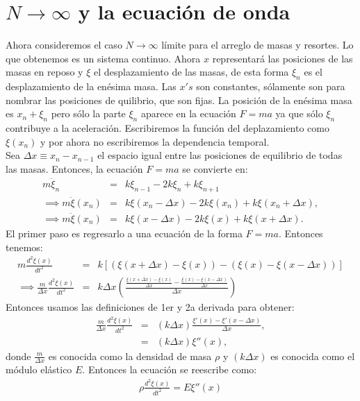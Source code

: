 \documentclass[letterpaper,12pt,oneside]{book}
\begin{document}
\section{$N \to \infty$ y la ecuaci\'on de onda}
Ahora consideremos el caso $N \to \infty$ l\'imite para el arreglo de masas y resortes. Lo que obtenemos es un sistema continuo. Ahora $x$ representar\'a las posiciones de las masas en reposo y $\xi$ el desplazamiento de las masas, de esta forma $\xi_n$ es el desplazamiento de la en\'esima masa. Las $x's$ son constantes, s\'olamente son para nombrar las posiciones de quilibrio, que son fijas. La posici\'on de la en\'esima masa es $x_n + \xi_n$ pero s\'olo la parte $\xi_n$ aparece en la ecuaci\'on $F=ma$ ya que s\'olo $\xi_n$ contribuye a la aceleraci\'on. Escribiremos la funci\'on del deplazamiento como $\xi(x_n)$ y por ahora no escribiremos la dependencia temporal.\\
Sea $\Delta x \equiv x_n - x_{n-1}$ el espacio igual entre las posiciones de equilibrio de todas las masas. Entonces, la ecuaci\'on $F=ma$ se convierte en:
%
\begin{eqnarray}
m\ddot \xi_n &=& k\xi_{n-1}-2k\xi_n + k\xi_{n+1}\\
\implies m\ddot \xi(x_n) &=& k\xi(x_n-\Delta x)-2k\xi(x_n)+ k\xi(x_n + \Delta x),\\
\implies m\ddot \xi(x_n) &=& k\xi(x-\Delta x)-2k\xi(x)+ k\xi(x + \Delta x).
\end{eqnarray}
%
El primer paso es regresarlo a una ecuaci\'on de la forma $F=ma$. Entonces tenemos:
%
\begin{eqnarray}
m\frac{d^2\xi(x)}{dt^2}&=&k\left[(\xi (x+\Delta x)-\xi(x))-(\xi(x)-\xi(x-\Delta x)) \right]\\
\implies \frac{m}{\Delta x}\frac{d^2\xi(x)}{dt^2}&=&k\Delta x\left(\frac{\frac{\xi(x+\Delta x)-\xi(x)}{\Delta x}-\frac{\xi(x)-\xi(x-\Delta x)}{\Delta x}}{\Delta x} \right)
\end{eqnarray}
%
Entonces usamos las definiciones de 1er y 2a derivada para obtener:
%
\begin{eqnarray}
\frac{m}{\Delta x}\frac{d^2\xi(x)}{dt^2} &=&(k\Delta x)\frac{\xi'(x)-\xi'(x-\Delta x)}{\Delta x},\\
&=&(k\Delta x)\xi''(x),
\end{eqnarray}
%
donde $\frac{m}{\Delta x}$ es conocida como la densidad de masa $\rho$ y $(k\Delta x)$ es conocida como el m\'odulo el\'astico $E$. Entonces la ecuaci\'on se reescribe como:
%
\begin{eqnarray}
\rho \frac{d^2 \xi(x)}{dt^2}=E\xi''(x)
\end{eqnarray}
\end{document}
